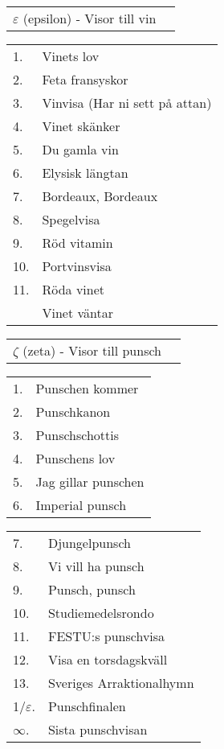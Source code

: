 \documentclass[a6paper,10pt]{article}
\begin{document}
\vspace{-5pt}

\vspace{-10pt}
\begin{table}[!h]
\begin{tabularx}{1\textwidth}{l X}
\Large $\varepsilon$ (epsilon) - Visor till vin&\\
\end{tabularx}
\end{table}
\begin{table}[!h]
\begin{tabularx}{1\textwidth}{l X}
1.&Vinets lov\\
2.&Feta fransyskor\\
3.&Vinvisa (Har ni sett på attan)\\
4.&Vinet skänker\\
5.&Du gamla vin\\
6.&Elysisk längtan\\
7.&Bordeaux, Bordeaux\\
8.&Spegelvisa\\
9.&Röd vitamin\\
10.&Portvinsvisa\\
11.&Röda vinet\\
&Vinet väntar
\end{tabularx}
\end{table}
\begin{table}[!h]
\begin{tabularx}{1\textwidth}{l X}
\Large $\zeta$ (zeta) - Visor till punsch&
\end{tabularx}
\end{table}
\begin{table}[!h]
\begin{tabularx}{1\textwidth}{l X}
1.&Punschen kommer\\
2.&Punschkanon\\
3.&Punschschottis\\
4.&Punschens lov\\
5.&Jag gillar punschen\\
6.&Imperial punsch
\end{tabularx}
\end{table}
\begin{table}[!h]
\begin{tabularx}{1\textwidth}{l X}
7.&Djungelpunsch\\
8.&Vi vill ha punsch\\
9.&Punsch, punsch\\
10.&Studiemedelsrondo\\
11.&FESTU:s punschvisa\\
12.&Visa en torsdagskväll\\
13.&Sveriges Arraktionalhymn\\
1/$\varepsilon$.&Punschfinalen\\
$\infty$.&Sista punschvisan
\end{tabularx}
\end{table}
\end{document}
